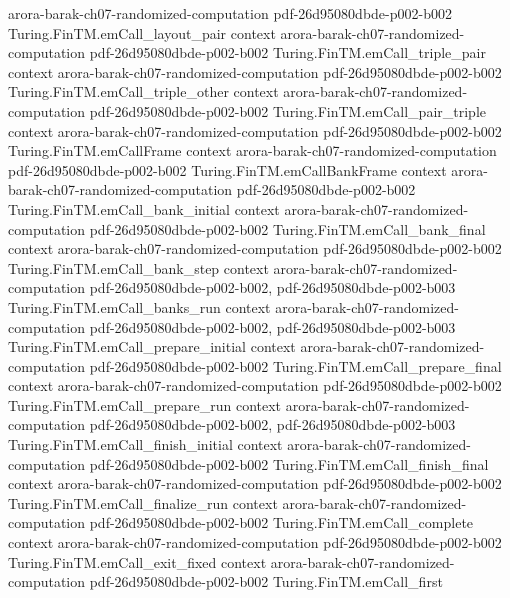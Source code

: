 \begin{theorem}
  {arora-barak-ch07-randomized-computation}
  {pdf-26d95080dbde-p002-b002}
\proofstep
  {Turing.FinTM.emCall_layout_pair}
  {context}
  {arora-barak-ch07-randomized-computation}
  {pdf-26d95080dbde-p002-b002}
\proofstep
  {Turing.FinTM.emCall_triple_pair}
  {context}
  {arora-barak-ch07-randomized-computation}
  {pdf-26d95080dbde-p002-b002}
\proofstep
  {Turing.FinTM.emCall_triple_other}
  {context}
  {arora-barak-ch07-randomized-computation}
  {pdf-26d95080dbde-p002-b002}
\proofstep
  {Turing.FinTM.emCall_pair_triple}
  {context}
  {arora-barak-ch07-randomized-computation}
  {pdf-26d95080dbde-p002-b002}
\proofstep
  {Turing.FinTM.emCallFrame}
  {context}
  {arora-barak-ch07-randomized-computation}
  {pdf-26d95080dbde-p002-b002}
\proofstep
  {Turing.FinTM.emCallBankFrame}
  {context}
  {arora-barak-ch07-randomized-computation}
  {pdf-26d95080dbde-p002-b002}
\proofstep
  {Turing.FinTM.emCall_bank_initial}
  {context}
  {arora-barak-ch07-randomized-computation}
  {pdf-26d95080dbde-p002-b002}
\proofstep
  {Turing.FinTM.emCall_bank_final}
  {context}
  {arora-barak-ch07-randomized-computation}
  {pdf-26d95080dbde-p002-b002}
\proofstep
  {Turing.FinTM.emCall_bank_step}
  {context}
  {arora-barak-ch07-randomized-computation}
  {pdf-26d95080dbde-p002-b002,
    pdf-26d95080dbde-p002-b003}
\proofstep
  {Turing.FinTM.emCall_banks_run}
  {context}
  {arora-barak-ch07-randomized-computation}
  {pdf-26d95080dbde-p002-b002,
    pdf-26d95080dbde-p002-b003}
\proofstep
  {Turing.FinTM.emCall_prepare_initial}
  {context}
  {arora-barak-ch07-randomized-computation}
  {pdf-26d95080dbde-p002-b002}
\proofstep
  {Turing.FinTM.emCall_prepare_final}
  {context}
  {arora-barak-ch07-randomized-computation}
  {pdf-26d95080dbde-p002-b002}
\proofstep
  {Turing.FinTM.emCall_prepare_run}
  {context}
  {arora-barak-ch07-randomized-computation}
  {pdf-26d95080dbde-p002-b002,
    pdf-26d95080dbde-p002-b003}
\proofstep
  {Turing.FinTM.emCall_finish_initial}
  {context}
  {arora-barak-ch07-randomized-computation}
  {pdf-26d95080dbde-p002-b002}
\proofstep
  {Turing.FinTM.emCall_finish_final}
  {context}
  {arora-barak-ch07-randomized-computation}
  {pdf-26d95080dbde-p002-b002}
\proofstep
  {Turing.FinTM.emCall_finalize_run}
  {context}
  {arora-barak-ch07-randomized-computation}
  {pdf-26d95080dbde-p002-b002}
\proofstep
  {Turing.FinTM.emCall_complete}
  {context}
  {arora-barak-ch07-randomized-computation}
  {pdf-26d95080dbde-p002-b002}
\proofstep
  {Turing.FinTM.emCall_exit_fixed}
  {context}
  {arora-barak-ch07-randomized-computation}
  {pdf-26d95080dbde-p002-b002}
\proofstep
  {Turing.FinTM.emCall_first}

\end{theorem}

